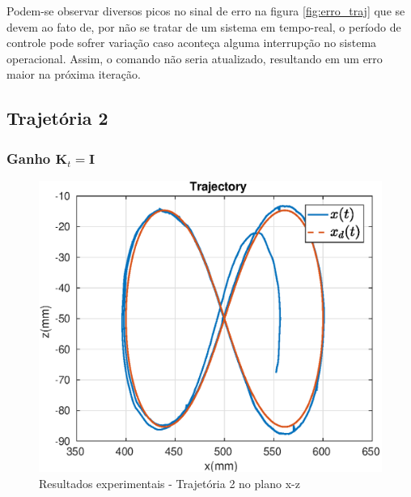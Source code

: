 Podem-se observar diversos picos no sinal de erro na figura \ref{fig:erro_traj} que se devem ao fato de, por não se tratar de um sistema em tempo-real, o período de controle pode sofrer variação caso aconteça alguma interrupção no sistema operacional. Assim, o comando não seria atualizado, resultando em um erro maior na próxima iteração.


\subsection{Trajetória 2}

\subsubsection{Ganho $\bm{K}_t = \bm{I}$}
\begin{figure}[H]
\centering
  \includegraphics[width=0.5\linewidth]{./img/traj_2_k1/traj.eps}
  \caption{Resultados experimentais - Trajetória 2 no plano x-z}
  \label{fig:sub1}
\end{figure}%


